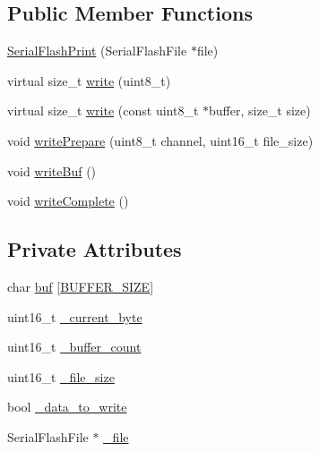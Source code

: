 \subsection*{Public Member Functions}
\begin{DoxyCompactItemize}
\item 
\hyperlink{class_serial_flash_print_a74950628c4028de6785bf936022322c6}{Serial\+Flash\+Print} (Serial\+Flash\+File $\ast$file)
\item 
virtual size\+\_\+t \hyperlink{class_serial_flash_print_a95a2b426100a53b7fc09e1130eaece94}{write} (uint8\+\_\+t)
\item 
virtual size\+\_\+t \hyperlink{class_serial_flash_print_af814e70a1869c2b418351acdb7ebecc7}{write} (const uint8\+\_\+t $\ast$buffer, size\+\_\+t size)
\item 
void \hyperlink{class_serial_flash_print_a657e3b8f295104f90842535dd0eea2e8}{write\+Prepare} (uint8\+\_\+t channel, uint16\+\_\+t file\+\_\+size)
\item 
void \hyperlink{class_serial_flash_print_aa3bc4b5315d97d3a2fb81391a9b83088}{write\+Buf} ()
\item 
void \hyperlink{class_serial_flash_print_a10d8aba39135e5b1cf6251961a87186f}{write\+Complete} ()
\end{DoxyCompactItemize}
\subsection*{Private Attributes}
\begin{DoxyCompactItemize}
\item 
char \hyperlink{class_serial_flash_print_a876c496ebcda3b4489fdfbc15e475c04}{buf} \mbox{[}\hyperlink{serial_flash_print_8h_a6b20d41d6252e9871430c242cb1a56e7}{B\+U\+F\+F\+E\+R\+\_\+\+S\+I\+ZE}\mbox{]}
\item 
uint16\+\_\+t \hyperlink{class_serial_flash_print_a696d4337c1f4b883bc5dc6f40ef4f742}{\+\_\+current\+\_\+byte}
\item 
uint16\+\_\+t \hyperlink{class_serial_flash_print_a6cc148b94a7b3be261918631c75cdfdd}{\+\_\+buffer\+\_\+count}
\item 
uint16\+\_\+t \hyperlink{class_serial_flash_print_a78602cd3cd89f168abb493e36bb77190}{\+\_\+file\+\_\+size}
\item 
bool \hyperlink{class_serial_flash_print_a0671fb69d73d7ca8d703443579b262a1}{\+\_\+data\+\_\+to\+\_\+write}
\item 
Serial\+Flash\+File $\ast$ \hyperlink{class_serial_flash_print_a92c30b40ce975e84b7dfd34352fb1469}{\+\_\+file}
\end{DoxyCompactItemize}


